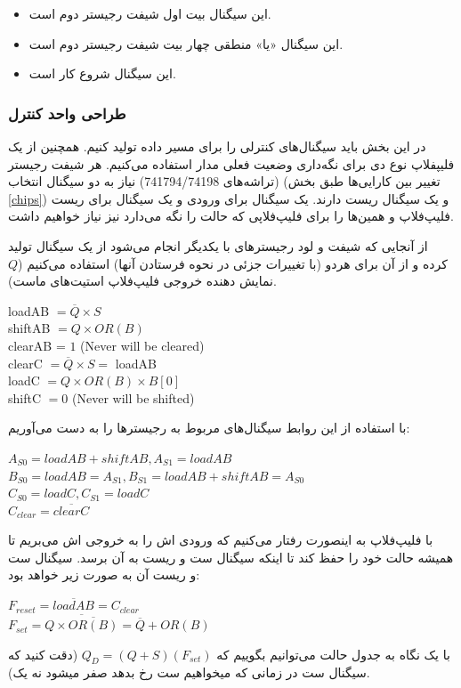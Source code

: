 \documentclass{article}
\begin{document}
\begin{itemize}
\item[\lr{B0}]
این سیگنال بیت اول شیفت رجیستر دوم است.
\item[\lr{ORB}]
این سیگنال «یا» منطقی چهار بیت شیفت رجیستر دوم است.
\item[\lr{S}]
این سیگنال شروع کار است.
\end{itemize}

\subsubsection{طراحی واحد کنترل}
در این بخش باید سیگنال‌های کنترلی را برای مسیر داده تولید کنیم. همچنین از یک فلیپفلاپ نوع دی برای نگه‌داری وضعیت فعلی مدار استفاده می‌کنیم. هر شیفت رجیستر (تراشه‌های 741794/74198) نیاز به دو سیگنال انتخاب (تغییر بین کارایی‌ها طبق بخش \ref{chips}) و یک سیگنال ریست دارند. یک سیگنال برای ورودی و یک سیگنال برای ریست فلیپ‌فلاپ  و همین‌ها را برای فلیپ‌فلاپی که حالت را نگه می‌دارد نیز نیاز خواهیم داشت. 

از آنجایی که شیفت و لود رجیسترهای  با یکدیگر انجام می‌شود از یک سیگنال تولید کرده و از آن برای هردو (با تغییرات جزئی در نحوه فرستادن آنها) استفاده می‌کنیم ($Q$ نمایش دهنده خروجی فلیپ‌فلاپ استیت‌های ماست).

\begin{latin}
\noindent
loadAB $= \overline{Q} \times S$\\
shiftAB $= Q  \times OR(B)$\\
clearAB = $1$ (Never will be cleared)\\
clearC $= \overline{Q} \times S = $ loadAB\\
loadC $= Q  \times OR(B) \times B[0]$\\
shiftC $= 0$ (Never will be shifted)
\end{latin}

با استفاده از این روابط سیگنال‌های مربوط به رجیسترها را به دست می‌آوریم:
\begin{latin}
\noindent
$A_{S0} = loadAB + shiftAB ,A_{S1} = loadAB$\\
$B_{S0} = loadAB = A_{S1} ,B_{S1} = loadAB + shiftAB = A_{S0}$\\
$C_{S0} = loadC ,C_{S1} = loadC$\\
$C_{clear} = \overline{clearC}$
\end{latin}

با فلیپ‌فلاپ  به اینصورت رفتار می‌کنیم که ورودی اش را به خروجی اش می‌بریم تا همیشه حالت خود را حفظ کند تا اینکه سیگنال ست و ریست به آن برسد. سیگنال ست و ریست آن به صورت زیر خواهد بود:

\begin{latin}
\noindent
$F_{reset} = \overline{loadAB} = C_{clear}$\\
$F_{set}= \overline{Q \times \overline{OR(B)}} = \overline{Q} + OR(B)$
\end{latin}

با یک نگاه به جدول حالت می‌توانیم بگوییم که
$Q_D = (Q+S)(F_{set})$
(دقت کنید که سیگنال ست در زمانی که میخواهیم ست رخ بدهد صفر میشود نه یک).
\end{document}
